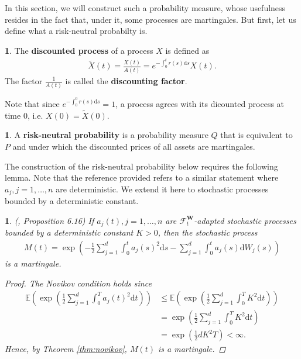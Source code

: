 \documentclass[english]{article}
\numberwithin{equation}{section}
\numberwithin{figure}{section}
\theoremstyle{bolddescit}
\theoremstyle{definition}
\newtheorem{definition}[theorem]{\protect\definitionname}
\theoremstyle{definition}
\theoremstyle{plain}
\newtheorem{lemma}[theorem]{\protect\lemmaname}
\theoremstyle{plain}
\theoremstyle{bolddesc}
\theoremstyle{plain}
\theoremstyle{remark}
\providecommand{\definitionname}{Definition}
\providecommand{\lemmaname}{Lemma}
\begin{document}
In this section, we will construct such a probability measure, whose usefulness resides in the fact that, under it, some processes are martingales. But first, let us define what a risk-neutral probabilty is.

\begin{definition}
  The \textbf{discounted process} of a process $X$ is defined as
  \begin{align*}
    \widetilde{X}(t) = \frac{X(t)}{A(t)} = e^{-\int_0^t r(s) \mathrm{d}s} X(t).
  \end{align*}
  The factor $\frac{1}{A(t)}$ is called the \textbf{discounting factor}.
\end{definition}

Note that since $e^{-\int_0^0 r(s) \mathrm{d}s} = 1$, a process agrees with its dicounted process at time 0, i.e. $X(0) = \widetilde{X}(0)$.

\begin{definition}
  A \textbf{risk-neutral probability} is a probability measure $Q$ that is equivalent to $P$ and under which the discounted prices of all assets are martingales.
\end{definition}

The construction of the risk-neutral probability below requires the following lemma. Note that the reference provided refers to a similar statement where $a_j, j=1,\ldots,n$ are deterministic. We extend it here to stochastic processes bounded by a deterministic constant.

\begin{lemma}\label{lem:bs-exponential-martingale}
  (\cite{capinski_blackscholes_2012}, Proposition 6.16)
  If $a_j(t), j=1,\ldots,n$ are $\mathcal{F}^\mathbf{W}_t$-adapted stochastic processes bounded by a deterministic constant $K > 0$, then the stochastic process
  \begin{align*}
    M(t) = \exp \left( - \frac{1}{2} \sum_{j=1}^{d} \int_0^t a_j(s)^2 \mathrm{d}s - \sum_{j=1}^{d} \int_0^t a_j(s) \mathrm{d}W_j(s) \right)
  \end{align*}
  is a martingale.

  \begin{proof}
    The Novikov condition holds since
    \begin{align*}
      \mathbb{E}\left(\exp \left(\frac{1}{2} \sum_{j=1}^d \int_0^T a_j(t)^2 \mathrm{d}t\right)\right)
      &\le \mathbb{E}\left(\exp \left(\frac{1}{2} \sum_{j=1}^d \int_0^T K^2 \mathrm{d}t\right)\right)\\
      &= \exp \left(\frac{1}{2} \sum_{j=1}^d \int_0^T K^2 \mathrm{d}t\right)\\
      &= \exp \left(\frac{1}{2} d K^2 T \right) < \infty.
    \end{align*}
    Hence, by Theorem \ref{thm:novikov}, $M(t)$ is a martingale.
  \end{proof}
\end{lemma}
\end{document}
